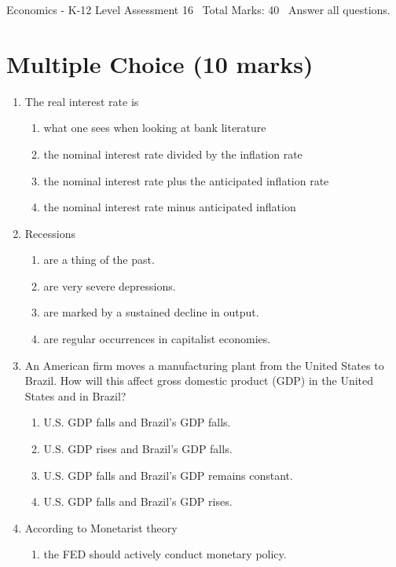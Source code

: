 \documentclass[12pt]{article}
\begin{document}
\begin{center}
Economics - K-12 Level Assessment 16 \
Total Marks: 40 \
Answer all questions.
\end{center}

\section*{Multiple Choice (10 marks)}
\begin{enumerate}[label=\arabic*.]
\item The real interest rate is
\begin{enumerate}[label=(\alph*)]
    \item what one sees when looking at bank literature
    \item the nominal interest rate divided by the inflation rate
    \item the nominal interest rate plus the anticipated inflation rate
    \item the nominal interest rate minus anticipated inflation
\end{enumerate}
\item Recessions
\begin{enumerate}[label=(\alph*)]
    \item are a thing of the past.
    \item are very severe depressions.
    \item are marked by a sustained decline in output.
    \item are regular occurrences in capitalist economies.
\end{enumerate}
\item An American firm moves a manufacturing plant from the United States to Brazil. How will this affect gross domestic product (GDP) in the United States and in Brazil?
\begin{enumerate}[label=(\alph*)]
    \item U.S. GDP falls and Brazil's GDP falls.
    \item U.S. GDP rises and Brazil's GDP falls.
    \item U.S. GDP falls and Brazil's GDP remains constant.
    \item U.S. GDP falls and Brazil's GDP rises.
\end{enumerate}
\item According to Monetarist theory
\begin{enumerate}[label=(\alph*)]
    \item the FED should actively conduct monetary policy.

\end{enumerate}
\end{enumerate}
\end{document}
